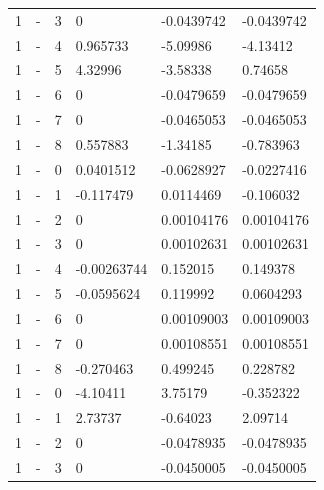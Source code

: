 \begin{longtable}
{}1 & \allowbreak{}-\allowbreak{} & 3 & 0 & -0.0439742 & -0.0439742 \\
{}1 & \allowbreak{}-\allowbreak{} & 4 & 0.965733 & -5.09986 & -4.13412 \\
{}1 & \allowbreak{}-\allowbreak{} & 5 & 4.32996 & -3.58338 & 0.74658 \\
{}1 & \allowbreak{}-\allowbreak{} & 6 & 0 & -0.0479659 & -0.0479659 \\
{}1 & \allowbreak{}-\allowbreak{} & 7 & 0 & -0.0465053 & -0.0465053 \\
{}1 & \allowbreak{}-\allowbreak{} & 8 & 0.557883 & -1.34185 & -0.783963 \\
{}1 & - & 0 & 0.0401512 & -0.0628927 & -0.0227416 \\
{}1 & - & 1 & -0.117479 & 0.0114469 & -0.106032 \\
{}1 & - & 2 & 0 & 0.00104176 & 0.00104176 \\
{}1 & - & 3 & 0 & 0.00102631 & 0.00102631 \\
{}1 & - & 4 & -0.00263744 & 0.152015 & 0.149378 \\
{}1 & - & 5 & -0.0595624 & 0.119992 & 0.0604293 \\
{}1 & - & 6 & 0 & 0.00109003 & 0.00109003 \\
{}1 & - & 7 & 0 & 0.00108551 & 0.00108551 \\
{}1 & - & 8 & -0.270463 & 0.499245 & 0.228782 \\
{}1 & \allowbreak{}-\allowbreak{} & 0 & -4.10411 & 3.75179 & -0.352322 \\
{}1 & \allowbreak{}-\allowbreak{} & 1 & 2.73737 & -0.64023 & 2.09714 \\
{}1 & \allowbreak{}-\allowbreak{} & 2 & 0 & -0.0478935 & -0.0478935 \\
{}1 & \allowbreak{}-\allowbreak{} & 3 & 0 & -0.0450005 & -0.0450005 \\

\end{longtable}
